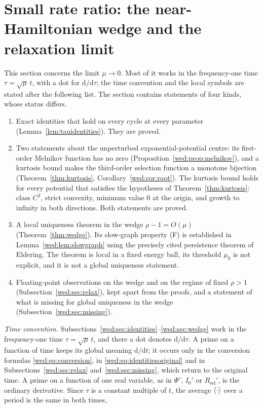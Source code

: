 \section{Small rate ratio: the near-Hamiltonian wedge and the relaxation limit}\label{sec:wedge}
This section concerns the limit $\mu\to0$. Most of it works in the frequency-one time $\tau=\sqrt\mu\,t$, with a dot for $\mathrm d/\mathrm d\tau$; the time convention and the local symbols are stated after the following list. The section contains statements of four kinds, whose status differs.
\begin{enumerate}[label=\textup{(\arabic*)}]
\item Exact identities that hold on every cycle at every parameter (Lemma~\ref{lem:tauidentities}). They are proved.
\item Two statements about the unperturbed exponential-potential centre: its first-order Melnikov function has no zero (Proposition~\ref{wed:prop:melnikov}), and a kurtosis bound makes the third-order selection function a monotone bijection (Theorem~\ref{thm:kurtosis}, Corollary~\ref{wed:cor:root}). The kurtosis bound holds for every potential that satisfies the hypotheses of Theorem~\ref{thm:kurtosis}: class $C^2$, strict convexity, minimum value $0$ at the origin, and growth to infinity in both directions. Both statements are proved.
\item A local uniqueness theorem in the wedge $\rho-1=O(\mu)$ (Theorem~\ref{thm:wedge}). Its slow-graph property \textup{(F)} is established in Lemma~\ref{wed:lem:slowgraph} using the precisely cited persistence theorem of Eldering. The theorem is local in a fixed energy ball, its threshold $\mu_0$ is not explicit, and it is not a global uniqueness statement.
\item Floating-point observations on the wedge and on the regime of fixed $\rho>1$ (Subsection~\ref{wed:sec:relax}), kept apart from the proofs, and a statement of what is missing for global uniqueness in the wedge (Subsection~\ref{wed:sec:missing}).
\end{enumerate}
\emph{Time convention.} Subsections~\ref{wed:sec:identities}--\ref{wed:sec:wedge} work in the frequency-one time $\tau=\sqrt\mu\,t$, and there a dot denotes $\mathrm d/\mathrm d\tau$. A prime on a function of time keeps its global meaning $\mathrm d/\mathrm dt$; it occurs only in the conversion formulas \eqref{wed:eq:conversion}, in \eqref{wed:eq:identitiesoriginal} and in Subsections~\ref{wed:sec:relax} and~\ref{wed:sec:missing}, which return to the original time. A prime on a function of one real variable, as in $\Phi'$, $I_0'$ or $R_{\mathrm{sel}}'$, is the ordinary derivative. Since $\tau$ is a constant multiple of $t$, the average $\left\langle \cdot\right\rangle$ over a period is the same in both times,
